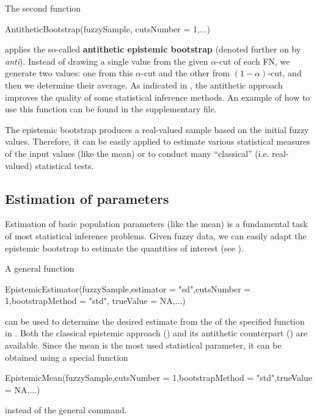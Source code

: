 The second function
\begin{example}
AntitheticBootstrap(fuzzySample, cutsNumber = 1,...)
\end{example}
applies the so-called \textbf{antithetic epistemic bootstrap} (denoted further on by \emph{anti}).
Instead of drawing a single value from the given $\alpha$-cut of each FN, we generate two values: one from this $\alpha$-cut and the other from $(1-\alpha)$-cut, and then we determine their average.
As indicated in \cite{10.1007/978-3-031-08974-9_39,pgmr2022}, the antithetic approach improves the quality of some statistical inference methods.
An example of how to use this function can be found in the supplementary file.

The epistemic bootstrap produces a real-valued sample based on the initial fuzzy values.
Therefore, it can be easily applied to estimate various statistical measures of the input values (like the mean) or to conduct many ``classical'' (i.e. real-valued) statistical tests.




\subsection{Estimation of parameters}


Estimation of basic population parameters (like the mean) is a fundamental task of most statistical inference problems. Given fuzzy data, we can easily adapt the epistemic bootstrap to estimate the quantities of interest (see  \citep{pgmr2022}).

A general function
\begin{example}
EpistemicEstimator(fuzzySample,estimator = "sd",cutsNumber = 1,bootstrapMethod = "std",
  trueValue = NA,...)
\end{example} 
can be used to determine the desired estimate from the  of the specified function in .
Both the classical epistemic approach () and its antithetic counterpart () are  available.
Since the mean is the most used statistical parameter, it can be obtained using a special function
\begin{example}
EpistemicMean(fuzzySample,cutsNumber = 1,bootstrapMethod = "std",trueValue = NA,...)
\end{example}
instead of the general command.

